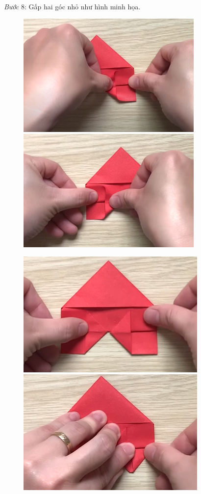 \begin{multicols}{2}
\begin{figure}[H]
			\vspace*{-15pt}
		\end{figure}
	\textit{Bước} $8$: Gấp hai góc nhỏ như hình minh họa.
		\begin{figure}[H]
			\vspace*{-5pt}
			\centering
			\captionsetup{labelformat= empty, justification=centering}
			\includegraphics[height= 0.327\linewidth]{35}
			\includegraphics[height= 0.327\linewidth]{36}
			
			\vspace*{1pt}
			\includegraphics[height= 0.327\linewidth]{37}
			\includegraphics[height= 0.327\linewidth]{38}
			

\end{figure}
\end{multicols}

